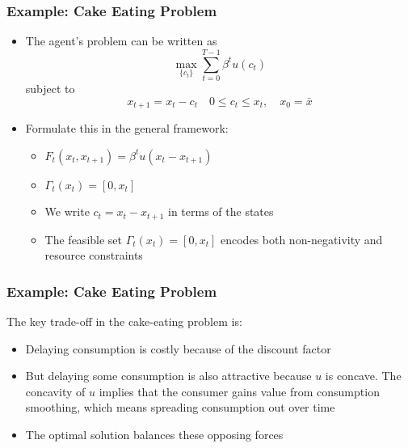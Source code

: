 \documentclass[9pt,aspectratio=169]{beamer}
\begin{document}
\begin{frame}
    \frametitle{Example: Cake Eating Problem}
    \begin{itemize}
        \item The agent's problem can be written as
        \begin{equation*}
            \max_{\{c_t\}} \sum_{t=0}^{T-1} \beta^t u(c_t)            
        \end{equation*}
        subject to
        \begin{equation*}
            x_{t+1} = x_t - c_t \quad 0\leq c_t\leq x_t, \quad x_0 = \bar{x}
        \end{equation*}
        \item Formulate this in the general framework:
        \begin{itemize}
            \item $F_t(x_t, x_{t+1}) = \beta^t u(x_t - x_{t+1})$
            \item $\Gamma_t(x_t) = [0, x_t]$
            \item We write $c_t = x_t - x_{t+1}$ in terms of the states
            \item The feasible set $\Gamma_t(x_t) = [0, x_t]$ encodes both
            non-negativity and resource constraints
        \end{itemize}
    \end{itemize}
\end{frame}

\begin{frame}
    \frametitle{Example: Cake Eating Problem}
    The key trade-off in the cake-eating problem is:
    \begin{itemize}
        \item Delaying consumption is costly because of the discount factor
        \item But delaying some consumption is also attractive because $u$ is
        concave. The concavity of $u$ implies that the consumer gains value
        from consumption smoothing, which means spreading consumption out
        over time
        \item The optimal solution balances these opposing forces
    \end{itemize}
\end{frame}
\end{document}
